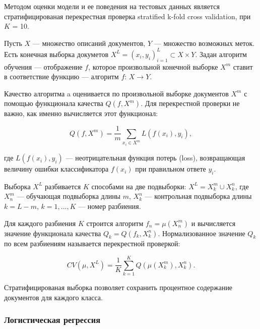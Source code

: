 Методом оценки модели и ее поведения на тестовых данных является стратифицированая перекрестная проверка stratified k-fold cross validation, при $K$ = 10.

Пусть $X$ --- множество описаний документов, $Y$ --- множество возможных меток.
Есть конечная выборка докуметов $X^L = (x_i,y_i)_{i=1}^L \subset X\times Y$.
Задан алгоритм обучения --- отображение $f$, которое произвольной конечной выборке $X^m$ ставит в соответствие функцию --- алгоритм $f:\,X\to Y$.

\bigskip
Качество алгоритма a оценивается по произвольной выборке документов $X^m$ с помощью функционала качества $Q(f,X^m)$. Для перекрестной проверки не важно, как именно вычисляется этот функционал:

\begin{equation*}
 Q(f,X^m)=\frac{1}{m}\sum_{x_i\in X^m} L(f(x_i),y_i),
\end{equation*}

\bigskip
где $L(f(x_i),y_i)$ — неотрицательная функция потерь (loss), возвращающая величину ошибки классификатора $f(x_i)$ при правильном ответе $y_i$.

\bigskip
Выборка $X^L$ разбивается $K$ способами на две подвыборки: $X^L = X^m_k \cup X^n_k$, где $X^m_n$ — обучающая подвыборка длины $m$, $X^n_k$ — контрольная подвыборка длины $k=L-m$, $k=1,\ldots,K$ — номер разбиения.

\bigskip
Для каждого разбиения $K$ строится алгоритм $f_n = \mu(X^m_n)$ и вычисляется значение функционала качества $Q_k = Q (f_k, X^n_k)$. Нормализованное значение $Q_k$ по всем разбиениям называется перекрестной проверкой:

\begin{equation*}
 CV(\mu,X^L)=\frac1K \sum_{k=1}^K Q (\mu(X^m_k), X^n_k).
\end{equation*}

\bigskip
Стратифицированая выборка позволяет сохранить процентное содержание документов для каждого класса.




















\subsubsection{Логистическая регрессия}
\label{subsection:logreg}

